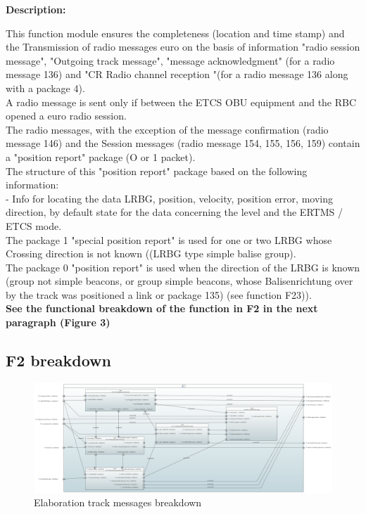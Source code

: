 \documentclass{template/openetcs_report}
\begin{document}
\textbf{Description:} 

This function module ensures the completeness (location and time stamp) and the 
Transmission of radio messages euro on the basis of information "radio session message", 
"Outgoing track message", "message acknowledgment" (for a radio message 136) and "CR 
Radio channel reception "(for a radio message 136 along with a package 4). \\

A radio message is sent only if between the ETCS OBU equipment and the 
RBC opened a euro radio session. \\

The radio messages, with the exception of the message confirmation (radio message 146) and the 
Session messages (radio message 154, 155, 156, 159) contain a "position report" package 
(O or 1 packet). \\

The structure of this "position report" package based on the following information: \\

- Info for locating the data LRBG, position, velocity, position error, moving direction,
by default state for the data concerning the level and the ERTMS / ETCS mode. \\

The package 1 "special position report" is used for one or two LRBG whose 
Crossing direction is not known ((LRBG type simple balise group). \\

The package 0 "position report" is used when the direction of the LRBG is known (group 
not simple beacons, or group simple beacons, whose Balisenrichtung over by the track 
was positioned a link or package 135) (see function F23)).\\
 	
 \textbf{See the functional breakdown of the function in F2 in the next paragraph (Figure 3)}\\
 
\subsection{F2 breakdown}	
 \begin{figure}[hbtp]
\centering
\includegraphics [angle=90, scale=0.3] {images/F2_Breakdown}
\caption{Elaboration track messages breakdown}
\end{figure}
\end{document}
